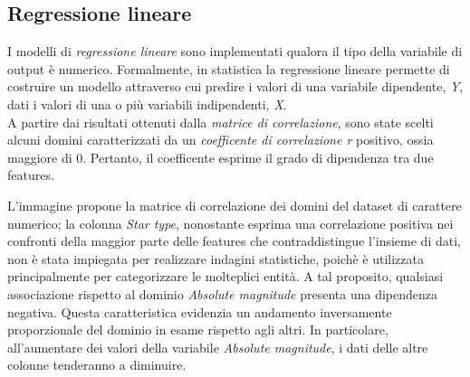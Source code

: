 \documentclass{article}
\begin{document}
    \subsection*{Regressione lineare}
    I modelli di \textit{regressione lineare} sono implementati qualora il tipo della variabile di output è numerico. Formalmente, in statistica la regressione lineare permette di costruire un modello attraverso cui predire i valori di una variabile dipendente, \textit{Y}, dati i valori di una o più variabili indipendenti, \textit{X}. \vspace*{7pt}\\
    A partire dai risultati ottenuti dalla \textit{matrice di correlazione}, sono state scelti alcuni domini caratterizzati da un \textit{coefficente di correlazione r} positivo, ossia maggiore di 0. Pertanto, il coefficente esprime il grado di dipendenza tra due features. 
    \begin{center}
    \end{center}
    L'immagine propone la matrice di correlazione dei domini del dataset di carattere numerico; la colonna \textit{Star type}, nonostante esprima una correlazione positiva nei confronti della maggior parte delle features che contraddistingue l'insieme di dati, non è stata impiegata per realizzare indagini statistiche, poichè è utilizzata principalmente per categorizzare le molteplici entità. A tal proposito, qualsiasi associazione rispetto al dominio \textit{Absolute magnitude} presenta una dipendenza negativa. Questa caratteristica evidenzia un andamento inversamente proporzionale del dominio in esame rispetto agli altri. In particolare, all'aumentare dei valori della variabile \textit{Absolute magnitude}, i dati delle altre colonne tenderanno a diminuire. \vspace*{7pt}\\
\end{document}
